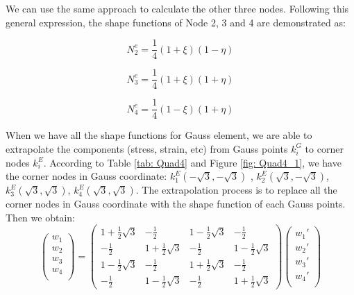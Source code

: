 We can use the same approach to calculate the other three nodes. Following this general expression, the shape functions of Node 2, 3 and 4 are demonstrated as:

\begin{equation}
N_2^e = \frac{1}{4} \left(1 + \xi\right) \left( 1 - \eta\right)
\end{equation}

\begin{equation}
N_3^e = \frac{1}{4} \left(1 + \xi\right) \left( 1 + \eta\right)
\end{equation}

\begin{equation}
N_4^e = \frac{1}{4} \left(1 - \xi\right) \left( 1 + \eta\right)
\end{equation}

When we have all the shape functions for Gauss element, we are able to extrapolate the components (stress, strain, etc) from Gauss points $k_i^G$ to corner nodes $k_i^E$. According to Table \ref{tab: Quad4} and  Figure \ref{fig: Quad4_1}, we have the corner nodes in Gauss coordinate: $k_1^E(-\sqrt{3}, -\sqrt{3})$ , $k_2^E(\sqrt{3}, -\sqrt{3})$, $k_3^E(\sqrt{3}, \sqrt{3})$, $k_4^E(\sqrt{3}, \sqrt{3})$. The extrapolation process is to replace all the corner nodes in Gauss coordinate with the shape function of each Gauss points. Then we obtain:
\begin{equation}
\begin{pmatrix}
w_1 \\
w_2 \\
w_3 \\
w_4 \\
\end{pmatrix} = \begin{pmatrix}
1 + \frac{1}{2} \sqrt{3} & -\frac{1}{2} &  1 - \frac{1}{2} \sqrt{3} &  -\frac{1}{2}       \\[0.3em]
-\frac{1}{2} & 1 + \frac{1}{2} \sqrt{3} & -\frac{1}{2} &  1 - \frac{1}{2} \sqrt{3}            \\[0.3em]
1 - \frac{1}{2} \sqrt{3} & -\frac{1}{2}  & 1 + \frac{1}{2} \sqrt{3} &  -\frac{1}{2}         \\[0.3em]
-\frac{1}{2} &  1 - \frac{1}{2} \sqrt{3} & -\frac{1}{2} &   1 + \frac{1}{2} \sqrt{3}                             
\end{pmatrix} \begin{pmatrix}
{w_1}' \\
{w_2}' \\
{w_3}' \\
{w_4}' \\
\end{pmatrix}
\end{equation}	
